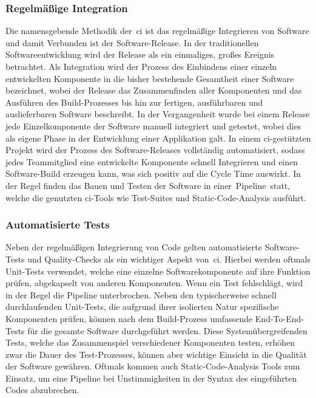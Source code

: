 \subsubsection{Regelmäßige Integration}

Die namensgebende Methodik der\ \acrshort{ci} ist das regelmäßige Integrieren von Software und damit Verbunden ist der
Software-Release.
In der traditionellen Softwareentwicklung wird der Release als ein einmaliges, großes Ereignis betrachtet.
Als Integration wird der Prozess des Einbindens einer einzeln entwickelten Komponente in die bisher bestehende
Gesamtheit einer Software bezeichnet, wobei der Release das Zusammenfinden aller Komponenten und das Ausführen des
Build-Prozesses bis hin zur fertigen, ausführbaren und auslieferbaren Software beschreibt.
In der Vergangenheit wurde bei einem Release jede Einzelkomponente der Software manuell integriert und getestet, wobei
dies als eigene Phase in der Entwicklung einer Applikation galt.
In einem \acrshort{ci}-gestützten Projekt wird der Prozess des Software-Releases vollständig automatisiert, sodass jedes
Teammitglied eine entwickelte Komponente schnell Integrieren und einen Software-Build erzeugen kann, was sich positiv
auf die Cycle Time auswirkt.
In der Regel finden das Bauen und Testen der Software in einer\ \glqq Pipeline\grqq\ statt, welche die genutzten
\acrshort{ci}-Tools wie Test-Suites und Static-Code-Analysis ausführt.

\subsubsection{Automatisierte Tests}

Neben der regelmäßigen Integrierung von Code gelten automatisierte Software-Tests und Quality-Checks als ein wichtiger
Aspekt von\ \acrshort{ci}.
Hierbei werden oftmals Unit-Tests verwendet, welche eine einzelne Softwarekomponente auf
ihre Funktion prüfen, abgekapselt von anderen Komponenten.
Wenn ein Test fehlschlägt, wird in der Regel die Pipeline unterbrochen.
Neben den typischerweise schnell durchlaufenden Unit-Tests, die aufgrund ihrer isolierten Natur spezifische Komponenten
prüfen, können nach dem Build-Prozess umfassende End-To-End-Tests für die gesamte Software durchgeführt werden.
Diese Systemübergreifenden Tests, welche das Zusammenspiel verschiedener Komponenten testen, erhöhen zwar die Dauer des
Test-Prozesses, können aber wichtige Einsicht in die Qualität der Software gewähren.
Oftmals kommen auch Static-Code-Analysis Tools zum Einsatz, um eine Pipeline bei Unstimmigkeiten in der Syntax des
eingeführten Codes abzubrechen.

